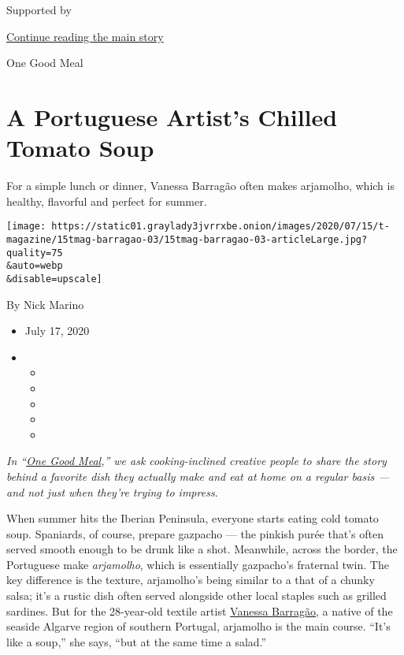 Supported by

\protect\hyperlink{after-sponsor}{Continue reading the main story}

One Good Meal

\hypertarget{a-portuguese-artists-chilled-tomato-soup}{%
\section{A Portuguese Artist's Chilled Tomato
Soup}\label{a-portuguese-artists-chilled-tomato-soup}}

For a simple lunch or dinner, Vanessa Barragão often makes arjamolho,
which is healthy, flavorful and perfect for summer.

\texttt{[image: https://static01.graylady3jvrrxbe.onion/images/2020/07/15/t-magazine/15tmag-barragao-03/15tmag-barragao-03-articleLarge.jpg?quality=75\\\&auto=webp\\\&disable=upscale]}

By Nick Marino

\begin{itemize}
\item
  July 17, 2020
\item
  \begin{itemize}
  \item
  \item
  \item
  \item
  \item
  \end{itemize}
\end{itemize}

\emph{In
``}\href{https://www.nytimes3xbfgragh.onion/column/one-good-meal?module=inline}{\emph{One
Good Meal}}\emph{,'' we ask cooking-inclined creative people to share
the story behind a favorite dish they actually make and eat at home on a
regular basis --- and not just when they're trying to impress.}

When summer hits the Iberian Peninsula, everyone starts eating cold
tomato soup. Spaniards, of course, prepare gazpacho --- the pinkish
purée that's often served smooth enough to be drunk like a shot.
Meanwhile, across the border, the Portuguese make \emph{arjamolho},
which is essentially gazpacho's fraternal twin. The key difference is
the texture, arjamolho's being similar to a that of a chunky salsa; it's
a rustic dish often served alongside other local staples such as grilled
sardines. But for the 28-year-old textile artist
\href{https://www.instagram.com/vanessabarragao_work/?hl=en}{Vanessa
Barragão}, a native of the seaside Algarve region of southern Portugal,
arjamolho is the main course. ``It's like a soup,'' she says, ``but at
the same time a salad.''

